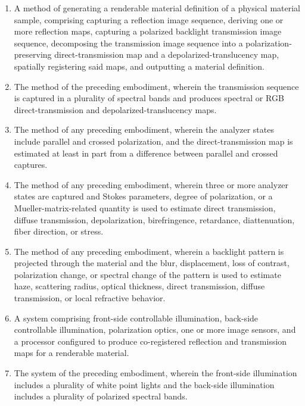 \documentclass[11pt, twoside, listof=totocnumbered, bibliography=totocnumbered]{scrartcl}
\begin{document}
	\begin{enumerate}
		\item A method of generating a renderable material definition of a physical material sample, comprising capturing a reflection image sequence, deriving one or more reflection maps, capturing a polarized backlight transmission image sequence, decomposing the transmission image sequence into a polarization-preserving direct-transmission map and a depolarized-translucency map, spatially registering said maps, and outputting a material definition.
		
		\item The method of the preceding embodiment, wherein the transmission sequence is captured in a plurality of spectral bands and produces spectral or RGB direct-transmission and depolarized-translucency maps.
		
		\item The method of any preceding embodiment, wherein the analyzer states include parallel and crossed polarization, and the direct-transmission map is estimated at least in part from a difference between parallel and crossed captures.
		
		\item The method of any preceding embodiment, wherein three or more analyzer states are captured and Stokes parameters, degree of polarization, or a Mueller-matrix-related quantity is used to estimate direct transmission, diffuse transmission, depolarization, birefringence, retardance, diattenuation, fiber direction, or stress.
		
		\item The method of any preceding embodiment, wherein a backlight pattern is projected through the material and the blur, displacement, loss of contrast, polarization change, or spectral change of the pattern is used to estimate haze, scattering radius, optical thickness, direct transmission, diffuse transmission, or local refractive behavior.
		
		\item A system comprising front-side controllable illumination, back-side controllable illumination, polarization optics, one or more image sensors, and a processor configured to produce co-registered reflection and transmission maps for a renderable material.
		
		\item The system of the preceding embodiment, wherein the front-side illumination includes a plurality of white point lights and the back-side illumination includes a plurality of polarized spectral bands.
		

\end{enumerate}
\end{document}
